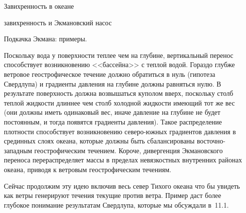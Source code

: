 \begin{chapter}{Завихренность в океане}
\begin{section}{завихренность и Экмановский насос}
\begin{paragraph}{Подкачка Экмана: примеры.}

Поскольку вода у поверхности теплее чем на глубине, вертикальный
перенос способствует возникновению <<бассейна>> с теплой водой. Гораздо
глубже ветровое геострофическое течение должно обратиться в нуль
(гипотеза Свердлупа) и градиенты давления на глубине должны равняться
нулю. В результате поверхность должна возвышаться куполом вверх,
поскольку столб теплой жидкости длиннее чем столб холодной жидкости
имеющий тот же вес (они должны иметь одинаковый вес, иначе давление на
глубине не будет постоянным, и тогда появятся градиенты
давления). Такое распределение плотности способствует возникновению
северо-южных градиентов давления в срединных слоях океана, которые
должны быть сбалансированы восточно-западным геострофическим
течением. Короче, дивергенция Экмановского переноса перераспределяет
массы в пределах невязкостных внутренних районах океана, приводя к
ветровым геострофическим течениям.
%

Сейчас продолжим эту идею включив весь север Тихого океана что бы
увидеть как ветры генерируют течения текущие против ветра. Пример даст
более глубокое понимание результатам Свердлупа, которые мы обсуждали
в~11.1.
%


\end{paragraph}
\end{section}
\end{chapter}
